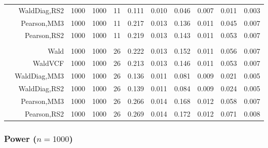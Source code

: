 \documentclass[
]{article}
\begin{document}
\begin{table}[H]
{\begin{tabular}[t]{lrrrrrrrlrr}
\hspace{1em} & WaldDiag,RS2 & 1000 & 1000 & 11 & 0.111 & 0.010 & 0.046 & 0.007 & 0.011 & 0.003\\

\hspace{1em} & Pearson,MM3 & 1000 & 1000 & 11 & 0.217 & 0.013 & 0.136 & 0.011 & 0.045 & 0.007\\

\hspace{1em} & Pearson,RS2 & 1000 & 1000 & 11 & 0.219 & 0.013 & 0.143 & 0.011 & 0.053 & 0.007\\
\cmidrule{1-11}
\addlinespace[0.3em]
\multicolumn{11}{l}{\textbf{3F 15V}}\\
\hspace{1em} & Wald & 1000 & 1000 & 26 & 0.222 & 0.013 & 0.152 & 0.011 & 0.056 & 0.007\\

\hspace{1em} & WaldVCF & 1000 & 1000 & 26 & 0.213 & 0.013 & 0.146 & 0.011 & 0.053 & 0.007\\

\hspace{1em} & WaldDiag,MM3 & 1000 & 1000 & 26 & 0.136 & 0.011 & 0.081 & 0.009 & 0.021 & 0.005\\

\hspace{1em} & WaldDiag,RS2 & 1000 & 1000 & 26 & 0.139 & 0.011 & 0.084 & 0.009 & 0.024 & 0.005\\

\hspace{1em} & Pearson,MM3 & 1000 & 1000 & 26 & 0.266 & 0.014 & 0.168 & 0.012 & 0.058 & 0.007\\

\hspace{1em} & Pearson,RS2 & 1000 & 1000 & 26 & 0.269 & 0.014 & 0.172 & 0.012 & 0.071 & 0.008\\
\bottomrule
\end{tabular}}
\endgroup{}
\end{table}

\hypertarget{power-n1000}{%
\subsubsection{\texorpdfstring{Power
(\(n=1000\))}{Power (n=1000)}}\label{power-n1000}}
\end{document}
